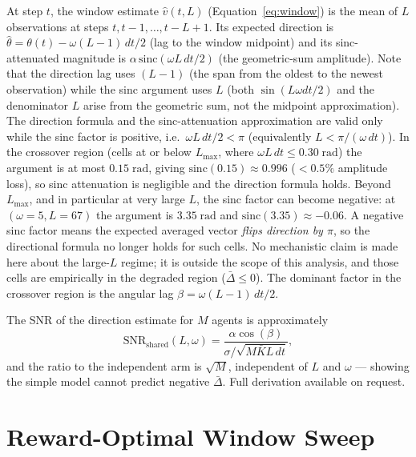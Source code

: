 \documentclass[sigconf,anonymous]{aamas}
\newcommand{\Dbar}{\bar{\Delta}}
\newcommand{\Lmax}{L_{\max}}
\newcommand{\angbias}{\beta}
\begin{document}
At step $t$, the window estimate $\hat{v}(t, L)$
(Equation~\ref{eq:window}) is the mean of $L$ observations at steps
$t, t{-}1, \ldots, t{-}L{+}1$.  Its expected direction is
$\hat{\theta} = \theta(t) - \omega(L{-}1)\,dt/2$ (lag to the window
midpoint) and its sinc-attenuated magnitude is
$\alpha\,\mathrm{sinc}(\omega L\,dt/2)$ (the geometric-sum amplitude).
Note that the direction lag uses $(L{-}1)$ (the span from the oldest
to the newest observation) while the sinc argument uses $L$
(both $\sin(L\omega dt/2)$ and the denominator $L$ arise from the
geometric sum, not the midpoint approximation).
The direction formula and the sinc-attenuation approximation are valid
only while the sinc factor is positive, i.e.\ $\omega L\,dt/2 < \pi$
(equivalently $L < \pi/(\omega\,dt)$).
In the crossover region (cells at or below $\Lmax$,
where $\omega L\,dt \leq 0.30\;\text{rad}$) the
argument is at most $0.15\;\text{rad}$, giving
$\mathrm{sinc}(0.15) \approx 0.996$ ($< 0.5\%$ amplitude loss),
so sinc attenuation is negligible and the direction formula holds.
Beyond $\Lmax$, and in particular at very large $L$, the sinc
factor can become negative: at $(\omega{=}5, L{=}67)$ the argument
is $3.35\;\text{rad}$ and $\mathrm{sinc}(3.35) \approx -0.06$.
A negative sinc factor means the expected averaged vector
\emph{flips direction by $\pi$}, so the directional formula
no longer holds for such cells. No mechanistic claim is made
here about the large-$L$ regime; it is outside the scope of this
analysis, and those cells are empirically in the degraded region
($\Dbar \leq 0$).
The dominant factor in the crossover region is the angular lag
$\angbias = \omega(L{-}1)\,dt/2$.

The SNR of the direction estimate for $M$ agents is approximately
\[
  \mathrm{SNR}_{\mathrm{shared}}(L, \omega) =
  \frac{\alpha \cos(\angbias)}{\sigma / \sqrt{M \bar{K} L\,dt}},
\]
and the ratio to the independent arm is $\sqrt{M}$, independent
of $L$ and $\omega$ — showing the simple model cannot predict
negative $\Dbar$.  Full derivation available on request.

\section{Reward-Optimal Window Sweep}
\label{app:gamma}
\end{document}
